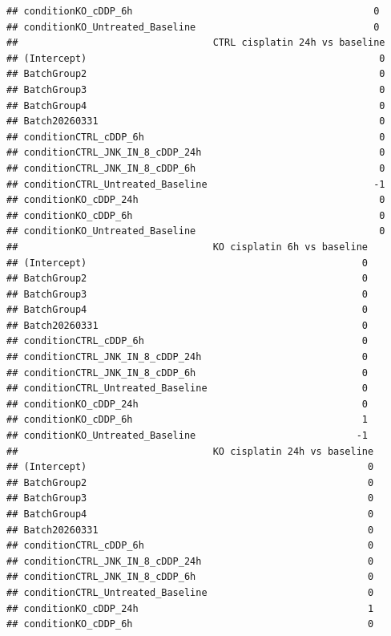\documentclass[
  10pt,
]{article}
\begin{document}
\begin{verbatim}
## conditionKO_cDDP_6h                                          0
## conditionKO_Untreated_Baseline                               0
##                                  CTRL cisplatin 24h vs baseline
## (Intercept)                                                   0
## BatchGroup2                                                   0
## BatchGroup3                                                   0
## BatchGroup4                                                   0
## Batch20260331                                                 0
## conditionCTRL_cDDP_6h                                         0
## conditionCTRL_JNK_IN_8_cDDP_24h                               0
## conditionCTRL_JNK_IN_8_cDDP_6h                                0
## conditionCTRL_Untreated_Baseline                             -1
## conditionKO_cDDP_24h                                          0
## conditionKO_cDDP_6h                                           0
## conditionKO_Untreated_Baseline                                0
##                                  KO cisplatin 6h vs baseline
## (Intercept)                                                0
## BatchGroup2                                                0
## BatchGroup3                                                0
## BatchGroup4                                                0
## Batch20260331                                              0
## conditionCTRL_cDDP_6h                                      0
## conditionCTRL_JNK_IN_8_cDDP_24h                            0
## conditionCTRL_JNK_IN_8_cDDP_6h                             0
## conditionCTRL_Untreated_Baseline                           0
## conditionKO_cDDP_24h                                       0
## conditionKO_cDDP_6h                                        1
## conditionKO_Untreated_Baseline                            -1
##                                  KO cisplatin 24h vs baseline
## (Intercept)                                                 0
## BatchGroup2                                                 0
## BatchGroup3                                                 0
## BatchGroup4                                                 0
## Batch20260331                                               0
## conditionCTRL_cDDP_6h                                       0
## conditionCTRL_JNK_IN_8_cDDP_24h                             0
## conditionCTRL_JNK_IN_8_cDDP_6h                              0
## conditionCTRL_Untreated_Baseline                            0
## conditionKO_cDDP_24h                                        1
## conditionKO_cDDP_6h                                         0

\end{verbatim}
\end{document}

